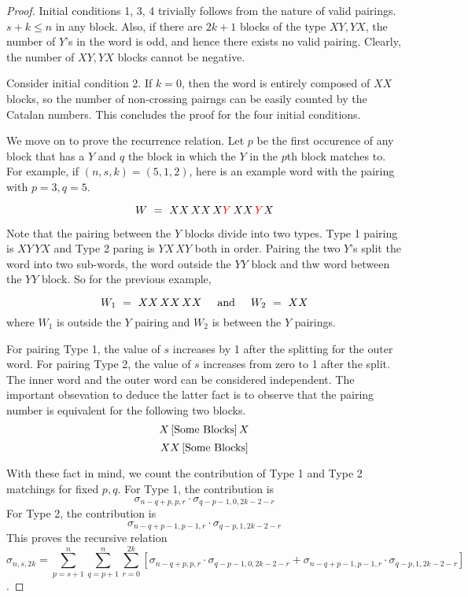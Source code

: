 \documentclass[12pt,reqno]{amsart}
\theoremstyle{plain} %
\theoremstyle{remark}
\theoremstyle{definition}
\begin{document}
\begin{proof}
    Initial conditions 1, 3, 4 trivially follows from the nature of 
    valid pairings. $s + k \leq n$ in any block. Also, if there are 
    $2k + 1$ blocks of the type $XY, YX$, the number of $Y$'s in the 
    word is odd, and hence there exists no valid pairing. Clearly, 
    the number of $XY, YX$ blocks cannot be negative. 

    Consider initial condition 2. If $k = 0$, then the word is entirely 
    composed of $XX$ blocks, so the number of non-crossing pairngs can 
    be easily counted by the Catalan numbers. This concludes the proof 
    for the four initial conditions. 

    We move on to prove the recurrence relation. Let $p$ be the 
    first occurence of any block that has a $Y$ and $q$ the block in which 
    the $Y$ in the $p$th block matches to. For example, if $(n, s, k) = (5, 1, 2)$, 
    here is an example word with the pairing with $p = 3, q = 5$. 

    \newcommand{\red}[1]{\color{red} {#1} \color{black}}

    \[
    W \ = \
    XX \, XX \, X\red{Y} \, XX \, \red{Y}X
    \]

    Note that the pairing between the $Y$ blocks divide into two types. 
    Type 1 pairing is $XY \, YX$ and Type 2 paring is $YX \, XY$ both in order. 
    Pairing the two $Y$'s split the word into two sub-words, the word 
    outside the $YY$ block and thw word between the $YY$ block. So for the previous example, 

    \[
        W_1 \ = \ XX \, XX \, XX \textAnd W_2 \ = \  XX
    \]
    where $W_1$ is outside the $Y$ pairing and $W_2$ is between the $Y$ pairings. 

    For pairing Type 1, the value of $s$ increases by 1 after the splitting for 
    the outer word. For pairing Type 2, the value of $s$ increases from zero to 1 
    after the split. The inner word and the outer word can be considered 
    independent. The important obsevation to deduce the latter fact is to observe 
    that the pairing number is equivalent for the following two blocks. 
    \[
    X \, [\textnormal{Some Blocks}] \, X
    \]
 \[
    XX \, [\textnormal{Some Blocks}]
    \]

    With these fact in mind, we count the contribution of 
    Type 1 and Type 2 matchings for fixed $p, q$. 
    For Type 1, the contribution is 
    \[
    \sigma_{n - q + p, p, r} \cdot \sigma_{q - p - 1, 0, 2k - 2 - r}
    \]
    For Type 2, the contribution is 
    \[
\sigma_{n - q + p - 1, p - 1, r} \cdot \sigma_{q - p, 1, 2k - 2 - r}
    \]
    This proves the recursive relation 
\[
\sigma_{n, s, 2k} = 
\sum_{p = s + 1}^{n} 
\sum_{q = p + 1}^{n}
\sum_{r = 0}^{2k}
\left[
\sigma_{n - q + p, p, r} \cdot \sigma_{q - p - 1, 0, 2k - 2 - r}
+ 
\sigma_{n - q + p - 1, p - 1, r} \cdot \sigma_{q - p, 1, 2k - 2 - r}
\right]
\]. 
\end{proof}
\end{document}
